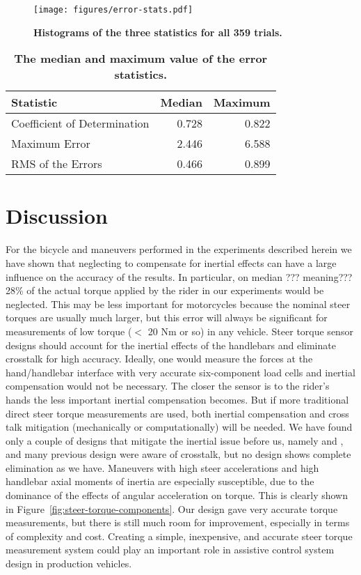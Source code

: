 \documentclass[10pt]{article}
\begin{document}
\begin{figure}
  \centering
  \texttt{[image: figures/error-stats.pdf]}
  \caption{{\bf Histograms of the three statistics for all 359 trials.}}
  \label{fig:error-stats}
\end{figure}

\begin{table}
  \caption{{\bf The median and maximum value of the error statistics.}}
  \centering
  \begin{tabular}{lrr}
    \hline
    Statistic                    & Median   & Maximum \\
    \hline
    Coefficient of Determination & 0.728 & 0.822 \\
    Maximum Error                & 2.446 & 6.588 \\
    RMS of the Errors            & 0.466 & 0.899
  \end{tabular}
  \label{tab:medians}
\end{table}

\section*{Discussion}

For the bicycle and maneuvers performed in the experiments described herein we have shown
that neglecting to compensate for inertial effects can have a large influence
on the accuracy of the results. In particular, on median ??? meaning??? 28\% of the actual
torque applied by the rider in our experiments would be neglected. This may be
less important for motorcycles because the nominal steer torques are usually
much larger, but this error will always be significant for measurements of low
torque ($<$ 20 Nm or so) in any vehicle. Steer torque sensor designs should
account for the inertial effects of the handlebars and eliminate crosstalk for
high accuracy. Ideally, one would measure the forces at the hand/handlebar
interface with very accurate six-component load cells and inertial compensation
would not be necessary. The closer the sensor is to the rider's hands the less
important inertial compensation becomes. But if more traditional direct steer
torque measurements are used, both inertial compensation and cross talk
mitigation (mechanically or computationally) will be needed. We have found only
a couple of designs that mitigate the inertial issue before us, namely
\cite{Evertse2010} and \cite{Iuchi2006}, and many previous design were aware of
crosstalk, but no design shows complete elimination as we have. Maneuvers with
high steer accelerations and high handlebar axial moments of inertia are
especially susceptible, due to the dominance of the effects of angular
acceleration on torque. This is clearly shown in
Figure~\ref{fig:steer-torque-components}. Our design gave very accurate torque
measurements, but there is still much room for improvement, especially in terms
of complexity and cost. Creating a simple, inexpensive, and accurate steer
torque measurement system could play an important role in assistive control
system design in production vehicles.
\end{document}
